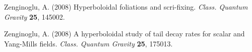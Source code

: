 \begin{thebibliography}{}
 Zenginoglu, A. (2008)
Hyperboloidal foliations and scri-fixing. \textit{Class. Quantum Gravity} {\bf 25}, 145002.

 Zenginoglu, A. (2008)
A hyperboloidal study of tail decay rates for scalar and Yang-Mills fields. \textit{Class. Quantum Gravity} {\bf 25}, 175013.




























\end{thebibliography}